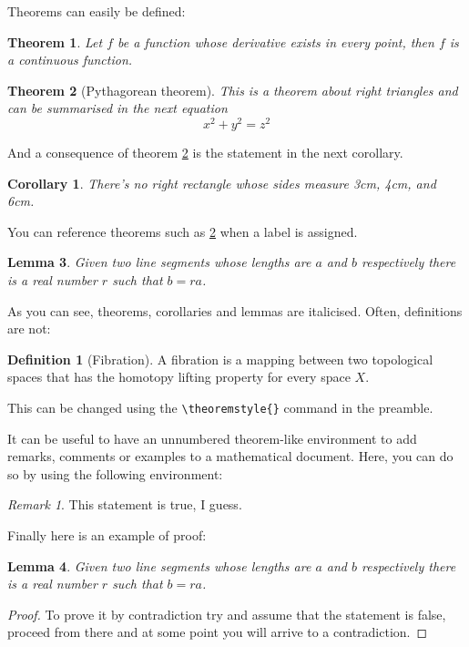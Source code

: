 \documentclass[a4paper,11pt, titlepage]{article}
\theoremstyle{definition}
\newtheorem{definition}{Definition}[section]
\theoremstyle{plain}
\newtheorem{theorem}{Theorem}[section]
\newtheorem{corollary}{Corollary}[theorem]
\newtheorem{lemma}[theorem]{Lemma}
\theoremstyle{remark}
\newtheorem*{remark}{Remark}
\begin{document}
Theorems can easily be defined:

\begin{theorem}
Let \(f\) be a function whose derivative exists in every point, then \(f\) is 
a continuous function.
\end{theorem}

\begin{theorem}[Pythagorean theorem]
\label{pythagorean}
This is a theorem about right triangles and can be summarised in the next 
equation 
\[ x^2 + y^2 = z^2 \]
\end{theorem}

And a consequence of theorem \ref{pythagorean} is the statement in the next 
corollary.

\begin{corollary}
There's no right rectangle whose sides measure 3cm, 4cm, and 6cm.
\end{corollary}

You can reference theorems such as \ref{pythagorean} when a label is assigned.

\begin{lemma}
Given two line segments whose lengths are \(a\) and \(b\) respectively there is a 
real number \(r\) such that \(b=ra\).
\end{lemma}

As you can see, theorems, corollaries and lemmas are italicised. Often, definitions are not: 
\begin{definition}[Fibration]
A fibration is a mapping between two topological spaces that has the homotopy lifting property for every space \(X\).
\end{definition}
This can be changed using the \verb!\theoremstyle{}! command in the preamble. 

It can be useful to have an unnumbered theorem-like environment to add remarks, comments or examples to a mathematical document. Here, you can do so by using the following environment: 

\begin{remark}
This statement is true, I guess.
\end{remark}

Finally here is an example of proof: 

\begin{lemma}
Given two line segments whose lengths are \(a\) and \(b\) respectively there 
is a real number \(r\) such that \(b=ra\).
\end{lemma}

\begin{proof}
To prove it by contradiction try and assume that the statement is false,
proceed from there and at some point you will arrive to a contradiction.
\end{proof}
\end{document}
